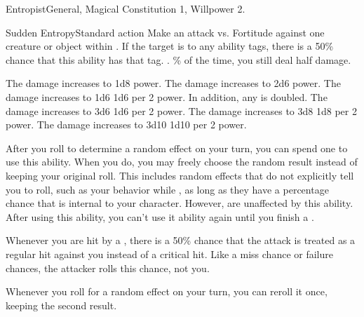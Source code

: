   \begin{magicalfeat}{Entropist}{General, Magical}
    \featpre Constitution 1, Willpower 2.

    \begin{magicalactiveability}{Sudden Entropy}{Standard action}
      \rankline
      Make an attack vs. Fortitude against one creature or object within \shortrange.
      If the target is \vulnerable to any ability tags, there is a 50\% chance that this ability has that tag.
      \hit \damageranktwo.
      \% of the time, you still deal half damage.

      \rankline
       The damage increases to 1d8 \add power.
       The damage increases to 2d6 \add power.
       The damage increases to 1d6 \add 1d6 per 2 power.
        In addition, any  is doubled.
       The damage increases to 3d6 \add 1d6 per 2 power.
       The damage increases to 3d8 \add 1d8 per 2 power.
       The damage increases to 3d10 \add 1d10 per 2 power.
    \end{magicalactiveability}

     After you roll to determine a random effect on your turn, you can spend one  to use this ability.
    When you do, you may freely choose the random result instead of keeping your original roll.
    This includes random effects that do not explicitly tell you to roll, such as your behavior while \confused, as long as they have a percentage chance that is internal to your character.
    However,  are unaffected by this ability.
    After using this ability, you can't use it ability again until you finish a .

     Whenever you are hit by a , there is a 50\% chance that the attack is treated as a regular hit against you instead of a critical hit.
    Like a miss chance or failure chances, the attacker rolls this chance, not you.

     Whenever you roll for a random effect on your turn, you can reroll it once, keeping the second result.
  \end{magicalfeat}

